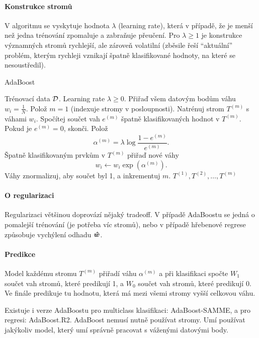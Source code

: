 \paragraph{Konstrukce stromů}

V algoritmu se vyskytuje hodnota $\lambda$ (learning rate), která v případě, že je menší než jedna trénování zpomaluje a zabraňuje přeučení. Pro $\lambda \ge 1$ je konstrukce významných stromů rychlejší, ale zároveň volatilní (zběsile řeší ``aktuální'' problém, kterým rychleji vznikají špatně klasifikované hodnoty, na které se nesoustředil).

\begin{algorithm}[H]
    \renewcommand{\thealgorithm}{}
    \caption{AdaBoost}
    \begin{algorithmic}[1]
        \Require
        \Statex Trénovací data $\mathcal{D}$.
        \Statex Learning rate $\lambda \ge 0$.
        \Statex
        \State Přiřaď všem datovým bodům váhu $w_i = \frac{1}{N}$.
        \State Polož $m = 1$ (indexuje stromy v posloupnosti).
        \State Natrénuj strom $T^{(m)}$ s váhami $w_i$.
        \State Spočítej součet vah $e^{(m)}$ špatně klasifikovaných hodnot v $T^{(m)}$.
        \State Pokud je $e^{(m)} = 0$, skonči.
        \State Polož \[\alpha^{(m)} = \lambda \log\frac{1 - e^{(m)}}{e^{(m)}}.\]
        \State Špatně klasifikovaným prvkům v $T^{(m)}$ přiřaď nové váhy
        \[w_i \leftarrow w_i \exp(\alpha^{(m)}).\]
        \State Váhy znormalizuj, aby součet byl 1, a inkrementuj $m$.
        \EndWhile
        \State \Return $T^{(1)}, T^{(2)}, \ldots, T^{(m)}$
    \end{algorithmic}
\end{algorithm}

\paragraph{O regularizaci}

Regularizaci většinou doprovází nějaký tradeoff. V případě AdaBoostu se jedná o pomalejší trénování (je potřeba víc stromů), nebo v případě hřebenové regrese způsobuje vychýlení odhadu $\bm{\hat{w}}$.

\paragraph{Predikce}

Model každému stromu $T^{(m)}$ přiřadí váhu $\alpha^{(m)}$ a při klasifikaci spočte $W_1$ součet vah stromů, které predikují 1, a $W_0$ součet vah stromů, které predikují 0. Ve finále predikuje tu hodnotu, která má mezi všemi stromy vyšší celkovou váhu.

Existuje i verze AdaBoostu pro multiclass klasifikaci: AdaBoost-SAMME, a pro regresi: AdaBoost.R2. AdaBoost nemusí nutně používat stromy. Umí používat jakýkoliv model, který umí správně pracovat s váženými datovými body.
